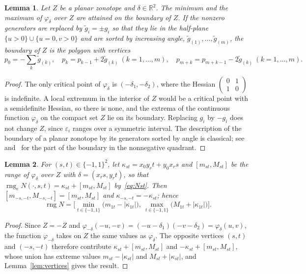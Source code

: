 \documentclass[11pt]{article}
\newtheorem{lemma}{Lemma}
\theoremstyle{definition}
\newcommand{\R}{\mathbb{R}}
\newcommand{\eps}{\varepsilon}
\newcommand{\rng}{\operatorname{rng}}
\begin{document}
\begin{lemma}
\label{lem:zonotope}
Let $Z$ be a planar zonotope and $\delta\in\R^2$. The minimum and the maximum of $\varphi_\delta$ over $Z$ are attained on the boundary of $Z$. If the nonzero generators are replaced by $\tilde g_i=\pm g_i$ so that they lie in the half-plane $\{u>0\}\cup\{u=0,v>0\}$ and are sorted by increasing angle, $\tilde g_{(1)},\dots,\tilde g_{(m)}$, the boundary of $Z$ is the polygon with vertices
\begin{equation}
\label{eq:boundary}
p_0=-\sum_k\tilde g_{(k)},\quad p_k = p_{k-1}+2\tilde g_{(k)}\ (k=1,\dots,m),\quad p_{m+k} = p_{m+k-1}-2\tilde g_{(k)}\ (k=1,\dots,m).
\end{equation}
\end{lemma}
\begin{proof}
The only critical point of $\varphi_\delta$ is $(-\delta_1,-\delta_2)$, where the Hessian $\left(\begin{smallmatrix}0&1\\1&0\end{smallmatrix}\right)$ is indefinite. A local extremum in the interior of $Z$ would be a critical point with a semidefinite Hessian, so there is none, and the extrema of the continuous function $\varphi_\delta$ on the compact set $Z$ lie on its boundary. Replacing $g_i$ by $-g_i$ does not change $Z$, since $\eps_i$ ranges over a symmetric interval. The description of the boundary of a planar zonotope by its generators sorted by angle is classical; see~\cite{ziegler1995lectures} and~\cite[Prop.~7]{skalna2017new} for the part of the boundary in the nonnegative quadrant.
\end{proof}

\begin{lemma}
\label{lem:pairs}
For $(s,t)\in\{-1,1\}^2$, let $\kappa_{st}=x_0y_rt+y_0x_rs$ and $[m_{st},M_{st}]$ be the range of $\varphi_\delta$ over $Z$ with $\delta=(x_rs,y_rt)$, so that $\rng_eN(\cdot,s,t)=\kappa_{st}+[m_{st},M_{st}]$ by~\eqref{eq:Nst}. Then $[m_{-s,-t},M_{-s,-t}]=[m_{st},M_{st}]$ and $\kappa_{-s,-t}=-\kappa_{st}$; hence
\[
\rng N=\Big[\min_{t\in\{-1,1\}}\big(m_{1t}-|\kappa_{1t}|\big),\ \max_{t\in\{-1,1\}}\big(M_{1t}+|\kappa_{1t}|\big)\Big].
\]
\end{lemma}
\begin{proof}
Since $Z=-Z$ and $\varphi_{-\delta}(-u,-v)=(-u-\delta_1)(-v-\delta_2)=\varphi_\delta(u,v)$, the function $\varphi_{-\delta}$ takes on $Z$ the same values as $\varphi_\delta$. The opposite vertices $(s,t)$ and $(-s,-t)$ therefore contribute $\kappa_{st}+[m_{st},M_{st}]$ and $-\kappa_{st}+[m_{st},M_{st}]$, whose union has extreme values $m_{st}-|\kappa_{st}|$ and $M_{st}+|\kappa_{st}|$, and Lemma~\ref{lem:vertices} gives the result.
\end{proof}
\end{document}
